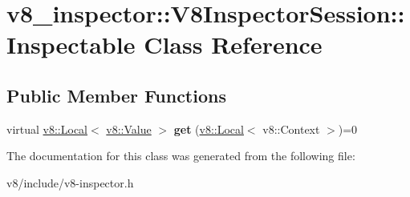 \hypertarget{classv8__inspector_1_1V8InspectorSession_1_1Inspectable}{}\section{v8\+\_\+inspector\+:\+:V8\+Inspector\+Session\+:\+:Inspectable Class Reference}
\label{classv8__inspector_1_1V8InspectorSession_1_1Inspectable}
\subsection*{Public Member Functions}
\begin{DoxyCompactItemize}
\item 
\mbox{\label{classv8__inspector_1_1V8InspectorSession_1_1Inspectable_ad7811abdabae6f826f98150f621cee63}} 
virtual \mbox{\hyperlink{classv8_1_1Local}{v8\+::\+Local}}$<$ \mbox{\hyperlink{classv8_1_1Value}{v8\+::\+Value}} $>$ {\bfseries get} (\mbox{\hyperlink{classv8_1_1Local}{v8\+::\+Local}}$<$ v8\+::\+Context $>$)=0
\end{DoxyCompactItemize}


The documentation for this class was generated from the following file\+:\begin{DoxyCompactItemize}
\item 
v8/include/v8-\/inspector.\+h\end{DoxyCompactItemize}

